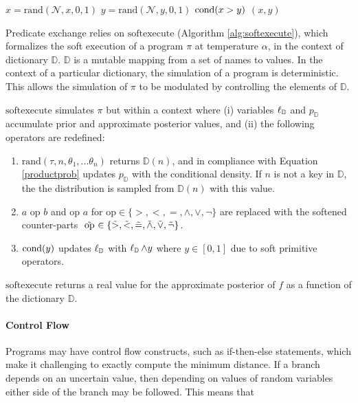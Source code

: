 \begin{exprogram}[tb]
\caption{}
\label{prog:ex1}
\begin{algorithmic}
\STATE $x = \textrm{rand}(\mathcal{N}, x, 0, 1)$
\STATE $y = \textrm{rand}(\mathcal{N}, y, 0, 1)$
\STATE $\operatorname{cond}(x > y)$
 $(x, y)$
\end{algorithmic}
\end{exprogram}


Predicate exchange relies on $\textrm{softexecute}$
(Algorithm \ref{alg:softexecute}), which formalizes the soft execution of a program $\pi$ at temperature $\alpha$, in the context of dictionary $\mathbb{D}$.
$\mathbb{D}$ is a mutable mapping from a set of names to values.
In the context of a particular dictionary, the simulation of a program is deterministic.
This allows the simulation of $\pi$ to be modulated by controlling the elements of $\mathbb{D}$.

$\textrm{softexecute}$ simulates $\pi$ but within a context where (i) variables $\operatorname{\ell}_\mathbb{D}$ and $p_\mathbb{D}$ accumulate prior and approximate posterior values, and (ii) the following operators are redefined:

\begin{enumerate}
  \item $\textrm{rand}(\tau, n, \theta_1, ...\theta_n)$ returns $\mathbb{D}(n)$, and in compliance with Equation \ref{productprob} updates $p_\mathbb{D}$ with the conditional density. If $n$ is not a key in $\mathbb{D}$, the the distribution is sampled from $\mathbb{D}(n)$ with this value.  
  \item $a \text{ op } b$ and $\textrm{op } a$ for $\textrm{op} \in \{>, <, =, \land, \lor, \neg\}$ are replaced with the softened counter-parts $\mathrel{\tilde{\textrm{ op }}} \in \{\mathrel{\tilde{>}}, \mathrel{\tilde{<}}, \mathrel{\tilde{=}}, \mathrel{\tilde{\land}}, \mathrel{\tilde{\lor}}, \mathrel{\tilde{\neg}}\}$.
  \item $\operatorname{cond}(y)$ updates $\operatorname{\ell}_\mathbb{D}$ with $\operatorname{\ell}_\mathbb{D} \land y$ where $y \in [0,1]$ due to soft primitive operators.  
\end{enumerate}

$\textrm{softexecute}$ returns a real value for the approximate posterior of $f$ as a function of the dictionary $\mathbb{D}$.

\paragraph{Control Flow}
Programs may have control flow constructs, such as if-then-else statements, which make it challenging to exactly compute the minimum distance.
If a branch depends on an uncertain value, then depending on values of random variables either side of the branch may be followed.
This means that 

